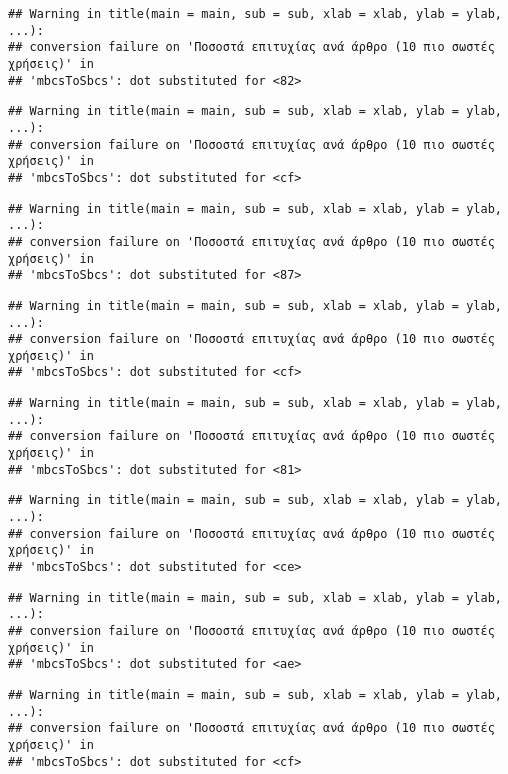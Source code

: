 \documentclass[
]{article}
\begin{document}
\begin{verbatim}
## Warning in title(main = main, sub = sub, xlab = xlab, ylab = ylab, ...):
## conversion failure on 'Ποσοστά επιτυχίας ανά άρθρο (10 πιο σωστές χρήσεις)' in
## 'mbcsToSbcs': dot substituted for <82>
\end{verbatim}

\begin{verbatim}
## Warning in title(main = main, sub = sub, xlab = xlab, ylab = ylab, ...):
## conversion failure on 'Ποσοστά επιτυχίας ανά άρθρο (10 πιο σωστές χρήσεις)' in
## 'mbcsToSbcs': dot substituted for <cf>
\end{verbatim}

\begin{verbatim}
## Warning in title(main = main, sub = sub, xlab = xlab, ylab = ylab, ...):
## conversion failure on 'Ποσοστά επιτυχίας ανά άρθρο (10 πιο σωστές χρήσεις)' in
## 'mbcsToSbcs': dot substituted for <87>
\end{verbatim}

\begin{verbatim}
## Warning in title(main = main, sub = sub, xlab = xlab, ylab = ylab, ...):
## conversion failure on 'Ποσοστά επιτυχίας ανά άρθρο (10 πιο σωστές χρήσεις)' in
## 'mbcsToSbcs': dot substituted for <cf>
\end{verbatim}

\begin{verbatim}
## Warning in title(main = main, sub = sub, xlab = xlab, ylab = ylab, ...):
## conversion failure on 'Ποσοστά επιτυχίας ανά άρθρο (10 πιο σωστές χρήσεις)' in
## 'mbcsToSbcs': dot substituted for <81>
\end{verbatim}

\begin{verbatim}
## Warning in title(main = main, sub = sub, xlab = xlab, ylab = ylab, ...):
## conversion failure on 'Ποσοστά επιτυχίας ανά άρθρο (10 πιο σωστές χρήσεις)' in
## 'mbcsToSbcs': dot substituted for <ce>
\end{verbatim}

\begin{verbatim}
## Warning in title(main = main, sub = sub, xlab = xlab, ylab = ylab, ...):
## conversion failure on 'Ποσοστά επιτυχίας ανά άρθρο (10 πιο σωστές χρήσεις)' in
## 'mbcsToSbcs': dot substituted for <ae>
\end{verbatim}

\begin{verbatim}
## Warning in title(main = main, sub = sub, xlab = xlab, ylab = ylab, ...):
## conversion failure on 'Ποσοστά επιτυχίας ανά άρθρο (10 πιο σωστές χρήσεις)' in
## 'mbcsToSbcs': dot substituted for <cf>
\end{verbatim}
\end{document}
